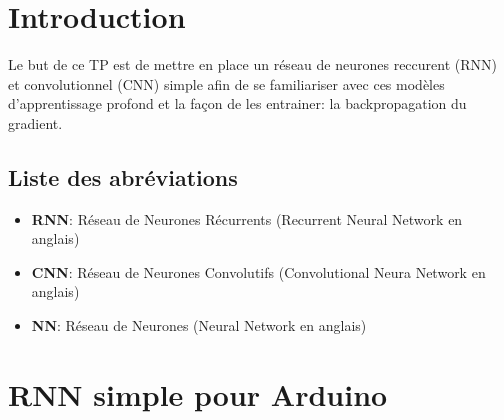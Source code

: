 \documentclass[a4paper, 12pt, openany]{book}
\begin{document}
\tableofcontents 

\clearpage 

\chapter{Introduction}

Le but de ce TP est de mettre en place un réseau de neurones reccurent (RNN) et convolutionnel (CNN) simple afin de se familiariser avec ces modèles d'apprentissage profond
et la façon de les entrainer: la backpropagation du gradient.

\section{Liste des abréviations}
\begin{itemize}
  \item \textbf{RNN}: Réseau de Neurones Récurrents (Recurrent Neural Network en anglais)
  \item \textbf{CNN}: Réseau de Neurones Convolutifs (Convolutional Neura Network en anglais)
  \item \textbf{NN}: Réseau de Neurones (Neural Network en anglais)
\end{itemize}


\chapter{RNN simple pour Arduino}
\end{document}
